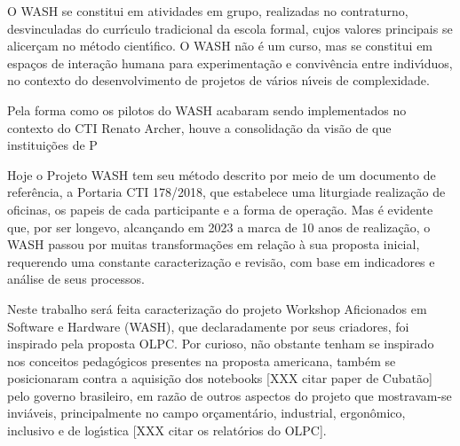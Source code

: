 \documentclass[
12pt,		%
openright,	%
twoside,  %
a4paper,			%
chapter=TITLE,		%
english,			%
french,				%
spanish,			%
brazil				%
]{USPSC-classe/USPSC}
\begin{document}
O WASH se constitui em atividades em grupo, realizadas no contraturno, desvinculadas do curr\'{\i}culo tradicional da escola formal, cujos valores principais se alicer\c{c}am no m\'etodo cient\'{\i}fico. O WASH n\~ao \'e um curso, mas se constitui em espa\c{c}os de intera\c{c}\~ao humana para experimenta\c{c}\~ao e conviv\^encia entre indiv\'{\i}duos, no contexto do desenvolvimento de projetos de v\'arios n\'{\i}veis de complexidade.










Pela forma como os pilotos do WASH acabaram sendo implementados no contexto do CTI Renato Archer, houve a consolida\c{c}\~ao da vis\~ao de que institui\c{c}\~oes de P










Hoje o Projeto WASH tem seu m\'etodo descrito por meio de um documento de refer\^encia, a Portaria CTI 178/2018, que estabelece uma \textquotedbl liturgia de realiza\c{c}\~ao de oficinas, os papeis de cada participante e a forma de opera\c{c}\~ao. Mas \'e evidente que, por ser longevo, alcan\c{c}ando em 2023 a marca de 10 anos de realiza\c{c}\~ao, o WASH passou por muitas transforma\c{c}\~oes em rela\c{c}\~ao \`a sua proposta inicial, requerendo uma constante caracteriza\c{c}\~ao e revis\~ao, com base em indicadores e an\'alise de seus processos.










Neste trabalho ser\'a feita caracteriza\c{c}\~ao do projeto Workshop Aficionados em Software e Hardware (WASH), que declaradamente por seus criadores, foi inspirado pela proposta OLPC. Por curioso, n\~ao obstante tenham se inspirado nos conceitos pedag\'ogicos presentes na proposta americana, tamb\'em se posicionaram contra a aquisi\c{c}\~ao dos notebooks [XXX citar paper de Cubat\~ao] pelo governo brasileiro, em raz\~ao de outros aspectos do projeto que mostravam-se invi\'aveis, principalmente no campo or\c{c}ament\'ario, industrial, ergon\^omico, inclusivo e de log\'{\i}stica [XXX citar os relat\'orios do OLPC].
\end{document}
